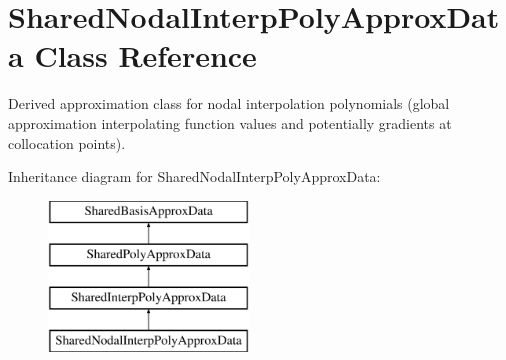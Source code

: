 \section{Shared\+Nodal\+Interp\+Poly\+Approx\+Data Class Reference}
\label{classPecos_1_1SharedNodalInterpPolyApproxData}


Derived approximation class for nodal interpolation polynomials (global approximation interpolating function values and potentially gradients at collocation points).  


Inheritance diagram for Shared\+Nodal\+Interp\+Poly\+Approx\+Data\+:\begin{figure}[H]
\begin{center}
\leavevmode
\includegraphics[height=4.000000cm]{classPecos_1_1SharedNodalInterpPolyApproxData}
\end{center}
\end{figure}
